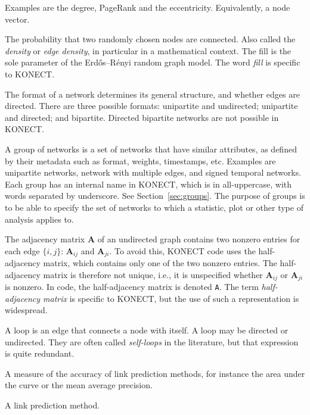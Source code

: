 \documentclass{article}
\begin{document}
\begin{description}
    Examples are the degree, PageRank and the eccentricity. 
    Equivalently, a node vector.
  \item[Fill] The probability that two randomly chosen nodes are
    connected.  Also called the \emph{density} or \emph{edge density}, in particular in a
    mathematical context.  The fill is the sole parameter of the
    Erdős--Rényi random graph model.  The word \emph{fill} is specific
    to KONECT. 
  \item[Format] 
    The format of a network determines its general structure, and
    whether edges are directed.  There are three possible formats:
    unipartite and undirected; unipartite and directed; and bipartite.
    Directed bipartite networks are not possible in KONECT.  
  \item[Group]
    A group of networks is a set of networks that have similar
    attributes, as defined by their metadata such as format, weights,
    timestamps, etc.  Examples are unipartite networks, network with
    multiple edges, and signed temporal networks.  Each group has an
    internal name in KONECT, which is in all-uppercase, with words
    separated by underscore.  See Section~\ref{sec:groups}.  The purpose
    of groups is to be able to specify the set of networks to which a
    statistic, plot or other type of analysis applies to.
  \item[Half-adjacency matrix]
    The adjacency matrix $\mathbf A$ of an undirected graph contains two
    nonzero entries for each edge $\{i,j\}$:  $\mathbf A_{ij}$ and
    $\mathbf A_{ji}$.  To avoid this, KONECT code uses the
    half-adjacency matrix, which contains only one of the two nonzero
    entries.  The half-adjacency matrix is therefore not unique, i.e.,
    it is unspecified whether $\mathbf A_{ij}$ or $\mathbf A_{ji}$ is nonzero.  In
    code, the half-adjacency matrix is denoted \texttt{A}.  The term
    \emph{half-adjacency matrix} is specific to KONECT, but the use of
    such a representation is widespread. 
  \item[Loop] 
    A loop is an edge that connects a node with itself.  A loop may be
    directed or undirected.  They are often called \emph{self-loops} in
    the literature, but that expression is quite redundant. 
  \item[Measure]
    A measure of the accuracy of link prediction methods, for instance
    the area under the curve or the mean average precision.  
  \item[Method]
    A link prediction method. 
  \item[Normalization]

\end{description}
\end{document}
